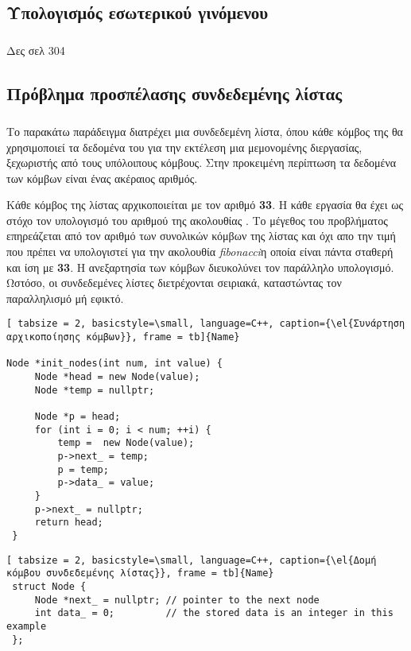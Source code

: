 \subsection{Υπολογισμός εσωτερικού γινόμενου}
\subparagraph{}

Δες \emph{} σελ 304

\subsection{Πρόβλημα προσπέλασης συνδεδεμένης λίστας}
\subparagraph{}
Το παρακάτω παράδειγμα διατρέχει μια συνδεδεμένη λίστα, όπου κάθε κόμβος της θα χρησιμοποιεί τα δεδομένα του για την εκτέλεση μια μεμονομένης διεργασίας, ξεχωριστής από τους υπόλοιπους κόμβους. Στην προκειμένη περίπτωση τα δεδομένα των κόμβων είναι ένας ακέραιος αριθμός.


Κάθε κόμβος της λίστας αρχικοποιείται με τον αριθμό \textbf{33}. Η κάθε εργασία θα έχει ως στόχο τον υπολογισμό του αριθμού της ακολουθίας \emph{}.
Το μέγεθος του προβλήματος επηρεάζεται από τον αριθμό των συνολικών κόμβων της λίστας και όχι απο την τιμή που πρέπει να υπολογιστεί για την ακολουθία \emph{fibonacci}η οποία είναι πάντα σταθερή και ίση με \textbf{33}.
Η ανεξαρτησία των κόμβων διευκολύνει τον παράλληλο υπολογισμό. Ωστόσο, οι συνδεδεμένες λίστες διετρέχονται σειριακά, καταστώντας τον παραλληλισμό μή εφικτό.
\ \\
\begin{center}

\begin{lstlisting}[ tabsize = 2, basicstyle=\small, language=C++, caption={\el{Συνάρτηση αρχικοποίησης κόμβων}}, frame = tb]{Name}
		
Node *init_nodes(int num, int value) {
     Node *head = new Node(value);
     Node *temp = nullptr;
 
     Node *p = head;
     for (int i = 0; i < num; ++i) {
         temp =  new Node(value);
         p->next_ = temp;
         p = temp;
         p->data_ = value;
     }
     p->next_ = nullptr;
     return head;
 }
\end{lstlisting}
\end{center}
\clearpage
{}
\begin{lstlisting}[ tabsize = 2, basicstyle=\small, language=C++, caption={\el{Δομή κόμβου συνδεδεμένης λίστας}}, frame = tb]{Name}
 struct Node {
     Node *next_ = nullptr; // pointer to the next node
     int data_ = 0;         // the stored data is an integer in this example
 };
\end{lstlisting}

